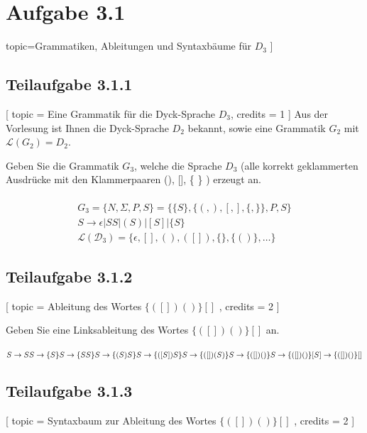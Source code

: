 \documentclass[12pt]{article}
\begin{document}
  

\section*{Aufgabe 3.1}  
 topic={Grammatiken, Ableitungen und Syntaxbäume für $D_3$} 
 ] 
  
 \subsection*{Teilaufgabe 3.1.1} [ 
 topic = {Eine Grammatik für die Dyck-Sprache $D_3$}, 
 credits = 1 
 ] 
 Aus der Vorlesung ist Ihnen die Dyck-Sprache $D_2$ bekannt, sowie eine Grammatik $G_2$ mit $\mathcal{L}(G_2) = D_2$.  
  
 Geben Sie die Grammatik $G_3$, welche die Sprache $D_3$ (alle korrekt geklammerten Ausdrücke mit den Klammerpaaren (), [], \{ \} ) erzeugt an.   \\\\
 \begin{align*}
 G_3 = \{N,\Sigma,P,S\} = \{\{S\},\{(,),[,],\{,\}\},P,S\}\\
 S \rightarrow \epsilon | SS | (S) | [S] | \{S\}\\
 \mathcal{L(D_3)} = \{\epsilon,[],(),([]),\{\},\{()\},\ldots \}
 \end{align*}
  
  
 \subsection*{Teilaufgabe 3.1.2} [ 
 topic = {Ableitung des Wortes $\{([])()\}[]$ }, 
 credits = 2 
 ] 
  
 Geben Sie eine Linksableitung des Wortes $\{([])()\}[]$ an. \\\\
  $
S \rightarrow SS\\
	\rightarrow \{S\}S\\
	\rightarrow \{SS\}S\\
	\rightarrow \{(S)S\}S\\  
	\rightarrow \{([S])S\}S\\
	\rightarrow \{([])(S)\}S\\
	\rightarrow \{([])()\}S\\
	\rightarrow \{([])()\}[S]\\
		\rightarrow \{([])()\}[]
  $
  
 \subsection*{Teilaufgabe 3.1.3} [ 
 topic = {Syntaxbaum zur Ableitung des Wortes $\{([])()\}[]$ }, 
 credits = 2 
 ] 
  
\end{document}
